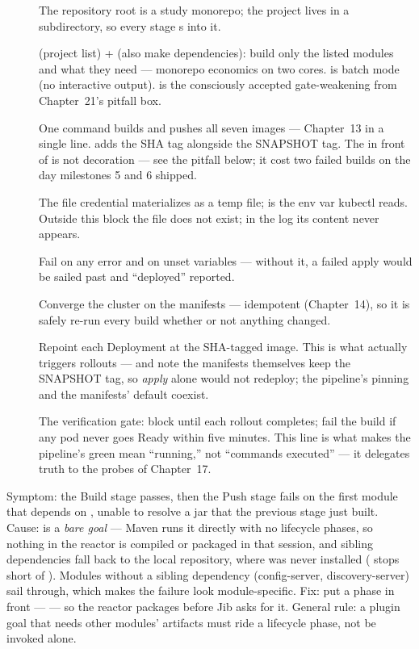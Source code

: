 \begin{description}
  \item[] The repository root is a study monorepo; the project
  lives in a subdirectory, so every stage s into it.
  \item[]  (project list) +  (also make
  dependencies): build only the listed modules and what they need ---
  monorepo economics on two cores.  is batch mode (no
  interactive output).  is the consciously accepted
  gate-weakening from Chapter~21's pitfall box.
  \item[] One command builds and pushes all seven images ---
  Chapter~13 in a single line.  adds the SHA tag
  alongside the SNAPSHOT tag. The  in front of
   is not decoration --- see the pitfall below; it
  cost two failed builds on the day milestones 5 and 6 shipped.
  \item[] The file credential materializes as a temp file;
   is the env var kubectl reads. Outside this block
  the file does not exist; in the log its content never appears.
  \item[] Fail on any error and on unset variables --- without
  it, a failed apply would be sailed past and ``deployed'' reported.
  \item[] Converge the cluster on the manifests --- idempotent
  (Chapter~14), so it is safely re-run every build whether or not
  anything changed.
  \item[] Repoint each Deployment at the SHA-tagged image. This
  is what actually triggers rollouts --- and note the manifests
  themselves keep the SNAPSHOT tag, so \emph{apply} alone would not
  redeploy; the pipeline's pinning and the manifests' default coexist.
  \item[] The verification gate: block until each rollout
  completes; fail the build if any pod never goes Ready within five
  minutes. This line is what makes the pipeline's green mean
  ``running,'' not ``commands executed'' --- it delegates truth to the
  probes of Chapter~17.
\end{description}

\begin{pitfall}
Symptom: the Build stage passes, then the Push stage fails on the
first module that depends on , unable to resolve a jar
that the previous stage just built. Cause:  is a
\emph{bare goal} --- Maven runs it directly with no lifecycle phases,
so nothing in the reactor is compiled or packaged in that session, and
sibling dependencies fall back to the local repository, where
 was never installed ( stops short of
). Modules without a sibling dependency (config-server,
discovery-server) sail through, which makes the failure look
module-specific. Fix: put a phase in front --- 
--- so the reactor packages  before Jib asks for it.
General rule: a plugin goal that needs other modules' artifacts must
ride a lifecycle phase, not be invoked alone.
\end{pitfall}

